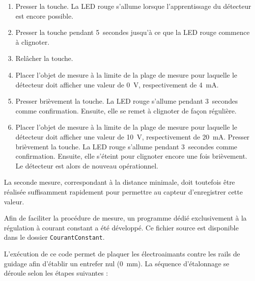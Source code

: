 \begin{enumerate}
  \item Presser la touche. La LED rouge s’allume lorsque l’apprentissage du détecteur est encore possible.

  \item Presser la touche pendant 5~secondes jusqu’à ce que la LED rouge commence à clignoter.

  \item Relâcher la touche.

  \item Placer l’objet de mesure à la limite de la plage de mesure pour laquelle le détecteur doit afficher une valeur de 0~V, respectivement de 4~mA.

  \item Presser brièvement la touche. La LED rouge s’allume pendant 3~secondes comme confirmation. Ensuite, elle se remet à clignoter de façon régulière.

  \item Placer l’objet de mesure à la limite de la plage de mesure pour laquelle le détecteur doit afficher une valeur de 10~V, respectivement de 20~mA. Presser brièvement la touche. La LED rouge s’allume pendant 3~secondes comme confirmation. Ensuite, elle s’éteint pour clignoter encore une fois brièvement. Le détecteur est alors de nouveau opérationnel.
\end{enumerate}

La seconde mesure, correspondant à la distance minimale, doit toutefois être réalisée suffisamment rapidement pour permettre au capteur d’enregistrer cette valeur.

Afin de faciliter la procédure de mesure, un programme dédié exclusivement à la régulation à courant constant a été développé. Ce fichier source est disponible dans le dossier \texttt{CourantConstant}.

L'exécution de ce code permet de plaquer les électroaimants contre les rails de guidage afin d'établir un entrefer nul (0~mm). La séquence d'étalonnage se déroule selon les étapes suivantes :

